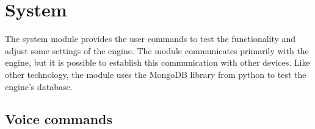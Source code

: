 \section{System}

The system module provides the user commands to test the functionality and adjust some settings of the engine. The module communicates primarily with the engine, but it is possible to establish this communication with other devices. Like other technology, the module uses the MongoDB library from python to test the engine's database.

\subsection{Voice commands}

\begin{table}[H]
    \centering
    \caption{Voice commands of the System module (for detail see \cref{section:app_system})} 
\end{table} 


